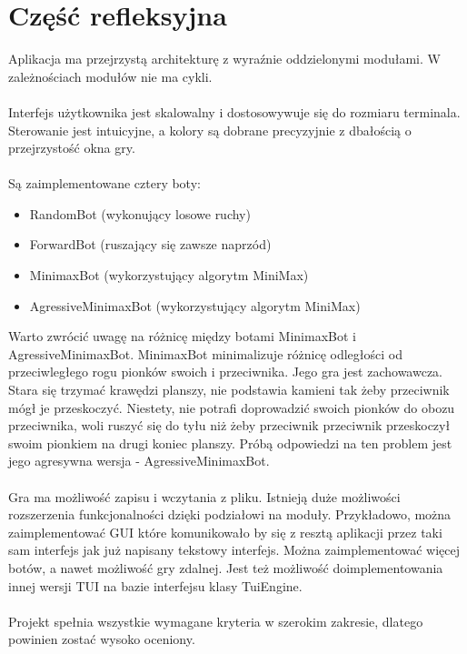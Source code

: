 \documentclass[12pt, titlepage]{article}
\begin{document}
\pagebreak
\section{Część refleksyjna}
Aplikacja ma przejrzystą architekturę z wyraźnie
oddzielonymi modułami. W zależnościach modułów nie
ma cykli. 
\\~\\
Interfejs użytkownika jest skalowalny i dostosowywuje się
do rozmiaru terminala. Sterowanie jest intuicyjne, a kolory
są dobrane precyzyjnie z dbałością o przejrzystość okna gry.
\\~\\
Są zaimplementowane cztery boty:
\begin{itemize}
	\item{RandomBot (wykonujący losowe ruchy)}
	\item{ForwardBot (ruszający się zawsze naprzód)}
	\item{MinimaxBot (wykorzystujący algorytm MiniMax)}
	\item{AgressiveMinimaxBot (wykorzystujący algorytm MiniMax)}
\end{itemize}

\noindent
Warto zwrócić uwagę
na różnicę między botami MinimaxBot i AgressiveMinimaxBot.
MinimaxBot minimalizuje różnicę odległości od przeciwległego rogu
pionków swoich i przeciwnika. Jego gra jest zachowawcza. Stara się
trzymać krawędzi planszy, nie podstawia kamieni tak żeby
przeciwnik mógł
je przeskoczyć. Niestety, nie potrafi doprowadzić swoich pionków do
obozu przeciwnika, woli ruszyć się do tyłu niż żeby przeciwnik
przeciwnik przeskoczył swoim pionkiem na drugi koniec planszy.
Próbą odpowiedzi na ten problem jest jego agresywna wersja -
AgressiveMinimaxBot.
\\~\\
Gra ma możliwość zapisu i wczytania z pliku. Istnieją duże możliwości
rozszerzenia
funkcjonalności dzięki podziałowi na moduły. Przykładowo, można
zaimplementować GUI które komunikowało by
się z resztą aplikacji przez taki sam interfejs jak już
napisany tekstowy interfejs. Można
zaimplementować więcej botów, a nawet możliwość gry zdalnej.
Jest też możliwość doimplementowania innej wersji TUI na
bazie interfejsu klasy TuiEngine.
\\~\\
Projekt spełnia wszystkie wymagane kryteria w szerokim zakresie,
dlatego powinien zostać wysoko oceniony.
\end{document}
